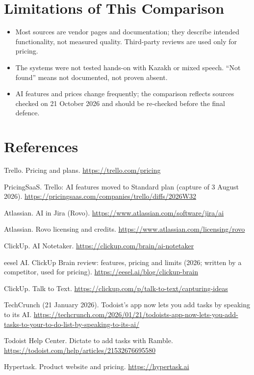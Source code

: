 \documentclass[11pt,a4paper]{article}
\begin{document}
\section{Limitations of This Comparison}

\begin{itemize}
  \item Most sources are vendor pages and documentation; they describe intended functionality, not measured quality. Third-party reviews are used only for pricing.
  \item The systems were not tested hands-on with Kazakh or mixed speech. ``Not found'' means not documented, not proven absent.
  \item AI features and prices change frequently; the comparison reflects sources checked on 21 October 2026 and should be re-checked before the final defence.
\end{itemize}

\section{References}\label{sec:refs}

\begin{enumerate}[label={[\arabic*]}, leftmargin=*]
  \item Trello. Pricing and plans. \url{https://trello.com/pricing}
  \item PricingSaaS. Trello: AI features moved to Standard plan (capture of 3 August 2026). \url{https://pricingsaas.com/companies/trello/diffs/2026W32}
  \item Atlassian. AI in Jira (Rovo). \url{https://www.atlassian.com/software/jira/ai}
  \item Atlassian. Rovo licensing and credits. \url{https://www.atlassian.com/licensing/rovo}
  \item ClickUp. AI Notetaker. \url{https://clickup.com/brain/ai-notetaker}
  \item eesel AI. ClickUp Brain review: features, pricing and limits (2026; written by a competitor, used for pricing). \url{https://eesel.ai/blog/clickup-brain}
  \item ClickUp. Talk to Text. \url{https://clickup.com/p/talk-to-text/capturing-ideas}
  \item TechCrunch (21 January 2026). Todoist's app now lets you add tasks by speaking to its AI. \url{https://techcrunch.com/2026/01/21/todoists-app-now-lets-you-add-tasks-to-your-to-do-list-by-speaking-to-its-ai/}
  \item Todoist Help Center. Dictate to add tasks with Ramble. \url{https://todoist.com/help/articles/21532676695580}
  \item Hypertask. Product website and pricing. \url{https://hypertask.ai}
\end{enumerate}
\end{document}
